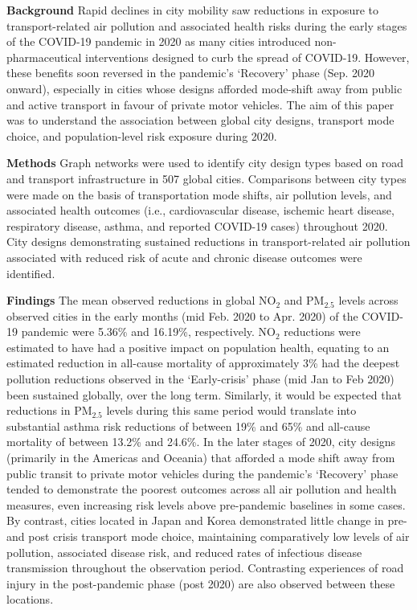 \documentclass[preprint,10pt]{elsarticle} %
\newcommand{\absdiv}[1]{%
  \par\addvspace{.5\baselineskip}%
  \noindent\textbf{#1}\quad\ignorespaces}
\begin{document}


 \absdiv{\textcolor{OliveGreen}{Background}}
Rapid declines in city mobility saw reductions in exposure to transport-related air pollution and associated health risks during the early stages of the COVID-19 pandemic in 2020 as many cities introduced non-pharmaceutical interventions designed to curb the spread of COVID-19. However, these benefits soon reversed in the pandemic's `Recovery' phase (Sep. 2020 onward), especially in cities whose designs afforded mode-shift away from public and active transport in favour of private motor vehicles. The aim of this paper was to understand the association between global city designs, transport mode choice, and population-level risk exposure during 2020.
 \absdiv{\textcolor{OliveGreen}{Methods}}
Graph networks were used to identify city design types based on road and transport infrastructure in 507 global cities. Comparisons between city types were made on the basis of transportation mode shifts, air pollution levels, and associated health outcomes (i.e., cardiovascular disease, ischemic heart disease, respiratory disease, asthma, and reported COVID-19 cases) throughout 2020. City designs demonstrating sustained reductions in transport-related air pollution associated with reduced risk of acute and chronic disease outcomes were identified.
 \absdiv{\textcolor{OliveGreen}{Findings}}
The mean observed reductions in global NO$_{2}$ and PM$_{2.5}$ levels across observed cities in the early months (mid Feb. 2020 to Apr. 2020) of the COVID-19 pandemic were 5.36\% and 16.19\%, respectively. NO$_{2}$ reductions were estimated to have had a positive impact on population health, equating to an estimated reduction in all-cause mortality of approximately 3\% had the deepest pollution reductions observed in the `Early-crisis' phase (mid Jan to Feb 2020) been sustained globally, over the long term. Similarly, it would be expected that reductions in PM$_{2.5}$ levels during this same period would translate into substantial asthma risk reductions of between 19\% and 65\% and all-cause mortality of between 13.2\% and 24.6\%. In the later stages of 2020, city designs (primarily in the Americas and Oceania) that afforded a mode shift away from public transit to private motor vehicles during the pandemic's `Recovery' phase tended to demonstrate the poorest outcomes across all air pollution and health measures, even increasing risk levels above pre-pandemic baselines in some cases. By contrast, cities located in Japan and Korea demonstrated little change in pre- and post crisis transport mode choice, maintaining comparatively low levels of air pollution, associated disease risk, and reduced rates of infectious disease transmission throughout the observation period. Contrasting experiences of road injury in the post-pandemic phase (post 2020) are also observed between these locations.
\end{document}
